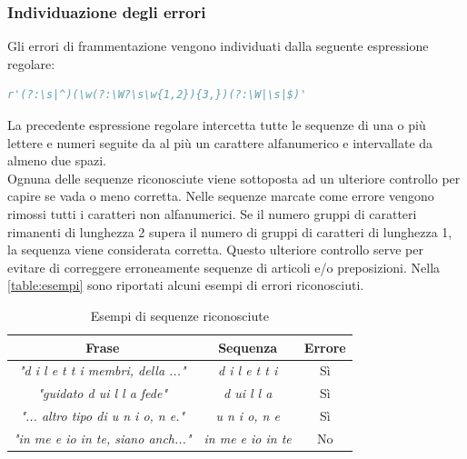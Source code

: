 \documentclass[12pt]{article}
\begin{document}
\subsubsection{Individuazione degli errori}
Gli errori di frammentazione vengono individuati dalla seguente espressione regolare:

\begin{lstlisting}[language=Python]
r'(?:\s|^)(\w(?:\W?\s\w{1,2}){3,})(?:\W|\s|$)'
\end{lstlisting}

\noindent La precedente espressione regolare intercetta tutte le sequenze di una o più lettere e numeri seguite da al più un carattere alfanumerico e intervallate da almeno due spazi.\\
Ognuna delle sequenze riconosciute viene sottoposta ad un ulteriore controllo per capire se vada o meno corretta. Nelle sequenze marcate come errore vengono rimossi tutti i caratteri non alfanumerici. Se il numero gruppi di caratteri rimanenti di lunghezza 2 supera il numero di gruppi di caratteri di lunghezza 1, la sequenza viene considerata corretta. Questo ulteriore controllo serve per evitare di correggere erroneamente sequenze di articoli e/o preposizioni. Nella \autoref{table:esempi} sono riportati alcuni esempi di errori riconosciuti.

\begin{table}[H]

	\centering
	\begin{tabular}{ccc}
	\textbf{Frase} & \textbf{Sequenza} & \textbf{Errore} \\ \hline
	
	\textit{"d i l e t t i membri, della ..."}	&	\textit{d i l e t t i}	&	Sì \\
	\textit{"guidato d ui l l a fede"}			& 	\textit{d ui l l a}		&	Sì \\
	\textit{"... altro tipo di u n i o, n e."}	&	\textit{u n i o, n e}	&	Sì \\
	\textit{"in me e io in te, siano anch..."}	&	\textit{in me e io in te}&	No
	\end{tabular}
	\caption{Esempi di sequenze riconosciute}
	\label{table:esempi}
\end{table}
\end{document}

